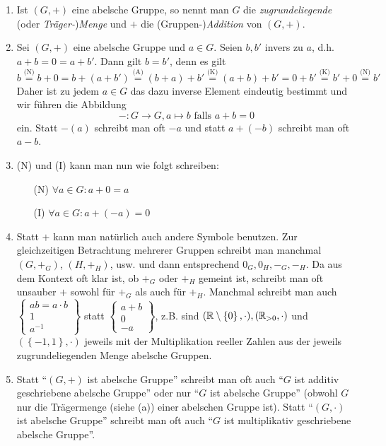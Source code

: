 \documentclass[../../main.tex]{subfiles}
\begin{document}
\begin{bem}\label{2.1.2}
\begin{enumerate}[\normalfont(a)]
\item Ist $(G,+)$ eine abelsche Gruppe, so nennt man $G$ die \emph{zugrundeliegende} (oder \emph{Träger-})\emph{Menge} und $+$ die (Gruppen-)\emph{Addition} von $(G,+)$.
\item Sei $(G,+)$ eine abelsche Gruppe und $a\in G$. Seien $b,b'$ invers zu $a$, d.h. $a+b=0=a+b'$. Dann gilt $b=b'$, denn es gilt
$$b\overset{\text{(N)}} = b+0 = b+(a+b') \overset{\text{(A)}} = (b+a)+b' \overset{\text{(K)}} = (a+b)+b' = 0+b' \overset{\text{(K)}}= b'+0 \overset{\text{(N)}}= b'$$
Daher ist zu jedem $a\in G$ das dazu inverse Element eindeutig bestimmt und wir führen die Abbildung
\[-:G\rightarrow G, a\mapsto b\text{ falls }a+b=0\]
ein. Statt $-(a)$ schreibt man oft $-a$ und statt $a+(-b)$ schreibt man oft $a-b$.
\item (N) und (I) kann man nun wie folgt schreiben:
\begin{itemize}
\item[(N)] $\forall a\in G:a+0=a$
\item[(I)] $\forall a\in G:a+(-a)=0$
\end{itemize}
\item Statt $+$ kann man natürlich auch andere Symbole benutzen. Zur gleichzeitigen Betrachtung mehrerer Gruppen schreibt man manchmal $(G,+_G)$, $(H,+_H)$, usw. und dann entsprechend $0_G, 0_H, -_G, -_H$. Da aus dem Kontext oft klar ist, ob $+_G$ oder $+_H$ gemeint ist, schreibt man oft unsauber $+$ sowohl für $+_G$ als auch für $+_H$. Manchmal schreibt man auch $\begin{Bmatrix}ab=a\cdot b\\1\\a^{-1}\end{Bmatrix}$ statt $\begin{Bmatrix}a+b\\0 \\ -a \end{Bmatrix}$, z.B. sind $(\mathbb R\setminus \left\{0\right\},\cdot), (\mathbb R_{>0},\cdot)$ und $(\left\{-1,1\right\},\cdot)$ jeweils mit der Multiplikation reeller Zahlen aus der jeweils zugrundeliegenden Menge abelsche Gruppen.
\item Statt "`$(G,+)$ ist abelsche Gruppe"' schreibt man oft auch "`$G$ ist additiv geschriebene abelsche Gruppe"' oder nur "`$G$ ist abelsche Gruppe"' (obwohl $G$ nur die Trägermenge (siehe (a)) einer abelschen Gruppe ist). Statt "`$(G,\cdot)$ ist abelsche Gruppe"' schreibt man oft auch "`$G$ ist multiplikativ geschriebene abelsche Gruppe"'.
\end{enumerate}
\end{bem}
\end{document}
